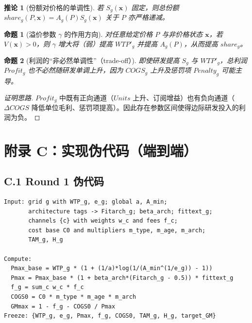 \documentclass[UTF8,12pt]{ctexart}
\newtheorem{proposition}{命题}
\newtheorem{corollary}{推论}
\begin{document}
\begin{corollary}[份额对价格的单调性]
若 $S_g(\mathbf{x})$ 固定，则总份额 $share_g(P,\mathbf{x})=A_g(P)S_g(\mathbf{x})$ 关于 $P$ 亦严格递减。
\end{corollary}

\begin{proposition}[溢价参数 $\gamma$ 的作用方向]
对任意给定价格 $P$ 与非价格状态 $\mathbf{x}$，若 $V(\mathbf{x})>0$，则 $\gamma$ 增大将（弱）提高 $WTP'_g$ 并提高 $A_g(P)$，从而提高 $share_g$。
\end{proposition}

\begin{proposition}[利润的“非必然单调性”（trade-off）]
即使研发提高 $S_g$ 与 $WTP'_g$，总利润 $Profit_g$ 也不必然随研发单调上升，因为 $COGS_g$ 上升及惩罚项 $Penalty_g$ 可能主导。
\end{proposition}
\begin{proof}[证明思路]
$Profit_g$ 中既有正向通道（$Units$ 上升、订阅增益）也有负向通道（$\Delta COGS$ 降低单位毛利、惩罚项提高）。因此存在参数区间使得边际研发投入的利润为负。
\end{proof}

\section{附录 C：实现伪代码（端到端）}

\subsection{C.1 Round 1 伪代码}
\begin{verbatim}
Input: grid g with WTP_g, e_g; global a, A_min; 
       architecture tags -> Fitarch_g; beta_arch; fittext_g;
       channels {c} with weights w_c and fees f_c;
       cost base C0 and multipliers m_type, m_age, m_arch; 
       TAM_g, H_g

Compute:
  Pmax_base = WTP_g * (1 + (1/a)*log(1/(A_min^(1/e_g)) - 1))
  Pmax = Pmax_base * (1 + beta_arch*(Fitarch_g - 0.5)) * fittext_g
  f_g = sum_c w_c * f_c
  COGS0 = C0 * m_type * m_age * m_arch
  GMmax = 1 - f_g - COGS0 / Pmax
Freeze: {WTP_g, e_g, Pmax, f_g, COGS0, TAM_g, H_g, target_GM}
\end{verbatim}
\end{document}
